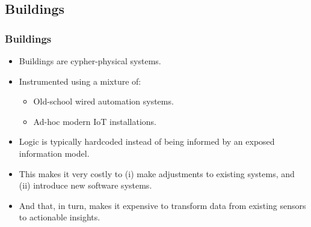 \subsection{Buildings}
\begin{frame}
  \frametitle{Buildings}
  \vspace{3mm}
  \begin{itemize}
    \item Buildings are cypher-physical systems.
    \item Instrumented using a mixture of:
      \begin{itemize}
        \item Old-school wired automation systems.
        \item Ad-hoc modern IoT installations.
      \end{itemize}
    \item Logic is typically hardcoded instead of being informed by an exposed information model.
    \item This makes it very costly to (i) make adjustments to existing systems, and (ii) introduce new software systems.
    \item And that, in turn, makes it expensive to transform data from existing sensors to actionable insights.
  \end{itemize}
\end{frame}

